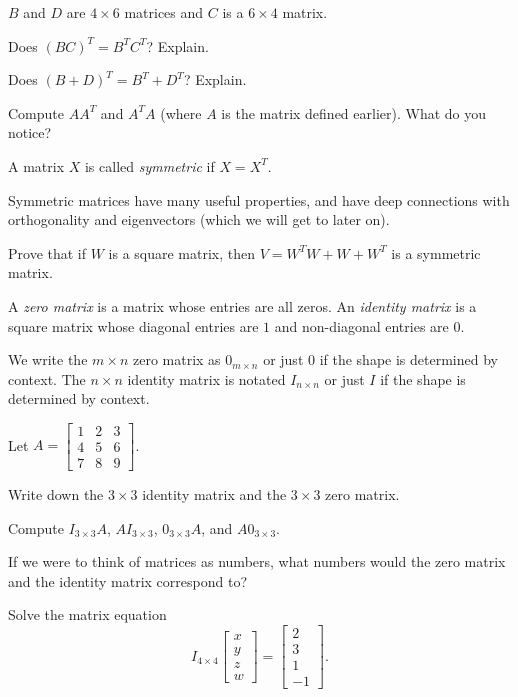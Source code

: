\documentclass{problemset}
\newcommand{\mat}[1]{\begin{bmatrix}#1\end{bmatrix}}
\begin{document}
	$B$ and $D$ are $4\times 6$ matrices and $C$ is a $6\times 4$ matrix.

	\begin{parts}[resume]
		\item Does $(BC)^T=B^TC^T$? Explain.
		\item Does $(B+D)^T=B^T+D^T$? Explain.
		\item Compute $AA^T$ and $A^TA$ (where $A$ is the matrix defined earlier).
		What do you notice?
	\end{parts}

	\question
	\begin{definition}
		A matrix $X$ is called \emph{symmetric} if $X=X^T$.  
	\end{definition}
	Symmetric matrices have many useful properties,
	and have deep connections with orthogonality and eigenvectors (which we will get to later on).

	\begin{parts}
		\item Prove that if $W$ is a square matrix, then $V=W^TW+W+W^T$ is a symmetric
		matrix.
	\end{parts}

	\question
	\begin{definition}
		A \emph{zero matrix} is a matrix whose entries are all zeros.
		An \emph{identity matrix} is a square matrix whose diagonal
		entries are $1$ and non-diagonal entries are $0$.
	\end{definition}
	We write the $m\times n$ zero matrix as $0_{m\times n}$ or just $0$ if the shape
	is determined by context.  The $n\times n$ identity matrix is notated $I_{n\times n}$ or just
	$I$ if the shape is determined by context.

	Let $A=\mat{1&2&3\\4&5&6\\7&8&9}$.
	\begin{parts}
		\item Write down the $3\times 3$ identity matrix and the $3\times 3$ zero
		matrix.
		\item Compute $I_{3\times 3}A$, $AI_{3\times 3}$, $0_{3\times 3}A$,
		and $A0_{3\times 3}$.
		\item If we were to think of matrices as numbers, what numbers would the
		zero matrix and the identity matrix correspond to?
	\end{parts}

	\question
	\begin{parts}
		\item Solve the matrix equation
		\[
			I_{4\times 4}\mat{x\\y\\z\\w} = \mat{2\\3\\1\\-1}.
		\]
	\end{parts}
\end{document}
